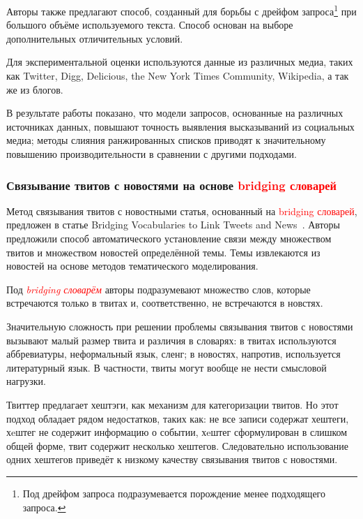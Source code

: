         Авторы также предлагают способ, созданный для борьбы с дрейфом запроса\footnote{Под дрейфом запроса подразумевается порождение менее подходящего запроса.}
        при большого объёме используемого текста.
        Способ основан на выборе дополнительных отличительных условий.

        Для экспериментальной оценки используются данные из различных медиа, таких как Twitter, Digg, Delicious, the New York Times Community, Wikipedia, а так же из блогов.

        В результате работы показано, что модели запросов, основанные на различных источниках данных, повышают точность выявления высказываний из социальных медиа;
        методы слияния ранжированных списков приводят к значительному повышению производительности в сравнении с другими подходами.

    \subsubsection{Связывание твитов с новостями на основе \textcolor{red}{bridging словарей}}
        Метод связывания твитов с новостными статья, основанный на \textcolor{red}{bridging словарей}, предложен в статье Bridging Vocabularies to Link Tweets and News~\cite{bridging}.
        Авторы предложили способ автоматического установление связи между множеством твитов и множеством новостей определённой темы.
        Темы извлекаются из новостей на основе методов тематического моделирования.

        Под \textcolor{red}{\textit{bridging словарём}} авторы подразумевают множество слов, которые встречаются только в твитах и, соответственно, не встречаются в новстях.

        Значительную сложность при решении проблемы связывания твитов с новостями вызывают малый размер твита и различия в словарях: в твитах используются аббревиатуры,
        неформальный язык, сленг; в новостях, напротив, используется литературный язык.
        В частности, твиты могут вообще не нести смысловой нагрузки.

        Твиттер предлагает хештэги, как механизм для категоризации твитов.
        Но этот подход обладает рядом недостатков, таких как: не все записи содержат хештеги, хeштег не содержит информацию о событии, хeштег сформулирован в слишком общей форме,
        твит содержит несколько хештегов.
        Следовательно использование одних хештегов приведёт к низкому качеству связывания твитов с новостями.

